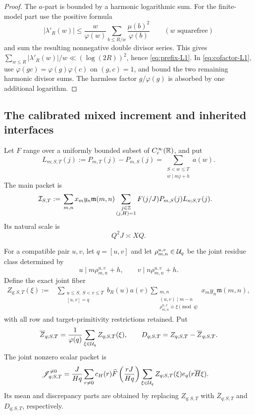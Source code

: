 \begin{proof}
The \(a\)-part is bounded by a harmonic logarithmic sum.  For the
finite-model part use the positive formula
\[
 |\lambda'_R(w)|
 \le\frac w{\varphi(w)}
 \sum_{b\le R/w}\frac{\mu(b)^2}{\varphi(b)}
 \qquad(w\text{ squarefree})
\]
and sum the resulting nonnegative double divisor series.  This gives
\(\sum_{w\le R}|\lambda'_R(w)|/w\ll(\log(2R))^2\), hence
\eqref{eq:prefix-L1}.  In \eqref{eq:cofactor-L1}, use
\(\varphi(gc)=\varphi(g)\varphi(c)\) on \((g,c)=1\), and bound the
two remaining harmonic divisor sums.  The harmless factor
\(g/\varphi(g)\) is absorbed by one additional logarithm.
\end{proof}

\subsection{The calibrated mixed increment and inherited interfaces}

Let \(F\) range over a uniformly bounded subset of
\(C_c^\infty(\mathbb R)\), and put
\begin{equation}
 L_{m;S,T}(j):=P_{m,T}(j)-P_{m,S}(j)
 =\sum_{\substack{S<w\le T\\w\mid mj+h}}a(w).
 \label{eq:long-increment}
\end{equation}
The main packet is
\begin{align}
 \mathcal I_{S,T}
 :={}&
 \sum_{m,n}x_my_n\mathfrak m(m,n)
 \sum_{\substack{j\in\mathbb Z\\(j,H)=1}}F(j/J)
 P_{m,S}(j)L_{n;S,T}(j).
 \label{eq:mixed-packet}
\end{align}
Its natural scale is
\begin{equation}
 Q^2J\asymp XQ.
 \label{eq:natural-scale}
\end{equation}

For a compatible pair \(u,v\), let \(q=[u,v]\) and let
\(\rho_{m,n}^{u,v}\in\mathcal U_q\) be the joint residue class determined by
\[
 u\mid m\rho_{m,n}^{u,v}+h,\qquad
 v\mid n\rho_{m,n}^{u,v}+h.
\]
Define the exact joint fiber
\begin{align}
 Z_{q;S,T}(\xi)
 :={}&
 \sum_{\substack{u\le S,\ S<v\le T\\{}[u,v]=q}}
 b_R(u)a(v)
 \sum_{\substack{m,n\\(u,v)\mid m-n\\
                  \rho_{m,n}^{u,v}\equiv\xi\pmod q}}
 x_my_n\mathfrak m(m,n),
 \label{eq:joint-fiber}
\end{align}
with all row and target-primitivity restrictions retained.  Put
\begin{equation}
 \overline Z_{q;S,T}
 =\frac1{\varphi(q)}\sum_{\xi\in\mathcal U_q}Z_{q;S,T}(\xi),
 \qquad
 D_{q;S,T}=Z_{q;S,T}-\overline Z_{q;S,T}.
 \label{eq:joint-fiber-centering}
\end{equation}
The joint nonzero scalar packet is
\begin{align}
 \mathscr J_{q;S,T}^{\ne0}
 ={}&\frac{J}{Hq}\sum_{r\ne0}c_H(r)
 \widehat F\left(\frac{rJ}{Hq}\right)
 \sum_{\xi\in\mathcal U_q}Z_{q;S,T}(\xi)
 e_q(r\overline H\xi).
 \label{eq:joint-nonzero-scalar}
\end{align}
Its mean and discrepancy parts are obtained by replacing \(Z_{q;S,T}\)
with \(\overline Z_{q;S,T}\) and \(D_{q;S,T}\), respectively.

